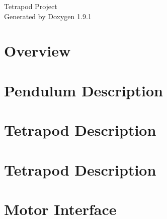 \let\mypdfximage\pdfximage\def\pdfximage{\immediate\mypdfximage}\documentclass[twoside]{book}
\newcommand{\+}{\discretionary{\mbox{\scriptsize$\hookleftarrow$}}{}{}}
\newcommand{\clearemptydoublepage}{%
  \newpage{\pagestyle{empty}\cleardoublepage}%
}
\begin{document}
\raggedbottom

\hypersetup{pageanchor=false,
             bookmarksnumbered=true,
             pdfencoding=unicode
            }
\begin{titlepage}
\vspace*{7cm}
\begin{center}%
{\Large Tetrapod Project }\\
\vspace*{1cm}
{\large Generated by Doxygen 1.9.1}\\
\end{center}
\end{titlepage}
\clearemptydoublepage
{}
\tableofcontents
\clearemptydoublepage
{}
\hypersetup{pageanchor=true}

\chapter{Overview}
\label{index}\hypertarget{index}{}
\chapter{Pendulum Description}
\label{md_catkin_ws_src_simulator_pendulum_description_README}

\chapter{Tetrapod Description}
\label{md_catkin_ws_src_simulator_single_leg_description_README}

\chapter{Tetrapod Description}
\label{md_catkin_ws_src_simulator_tetrapod_description_README}

\chapter{Motor Interface}
\label{md_Arduino_libraries_motor_driver_README}

\end{document}
